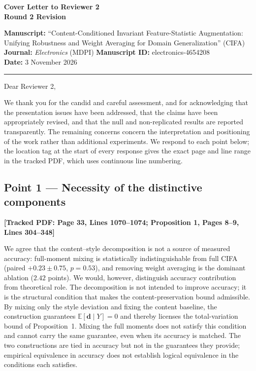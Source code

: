 \documentclass[11pt]{article}
\newcommand{\loc}[1]{\textbf{[\textcolor{revblue}{Tracked PDF: #1}]}}
\begin{document}
\begin{center}
{\Large\textbf{Cover Letter to Reviewer 2}}\\[0.5em]
\textbf{Round 2 Revision}
\end{center}

\textbf{Manuscript:} ``Content-Conditioned Invariant Feature-Statistic
Augmentation: Unifying Robustness and Weight Averaging for Domain
Generalization'' (CIFA)\\
\textbf{Journal:} \textit{Electronics} (MDPI)\qquad
\textbf{Manuscript ID:} electronics-4654208\\
\textbf{Date:} 3 November 2026

\hrule
\vspace{0.4em}

Dear Reviewer 2,

We thank you for the candid and careful assessment, and for acknowledging that
the presentation issues have been addressed, that the claims have been
appropriately revised, and that the null and non-replicated results are reported
transparently. The remaining concerns concern the interpretation and
positioning of the work rather than additional experiments. We respond to each
point below; the location tag at the start of every response gives the exact
page and line range in the tracked PDF, which uses continuous line numbering.

\subsection*{Point 1 --- Necessity of the distinctive components}
\loc{Page 33, Lines 1070--1074; Proposition 1, Pages 8--9, Lines 304--348}

We agree that the content--style decomposition is not a source of measured
accuracy: full-moment mixing is statistically indistinguishable from full CIFA
(paired $+0.23\pm0.75$, $p=0.53$), and removing weight averaging is the
dominant ablation ($2.42$ points). We would, however, distinguish accuracy
contribution from theoretical role. The decomposition is not intended to
improve accuracy; it is the structural condition that makes the
content-preservation bound admissible. By mixing only the style deviation and
fixing the content baseline, the construction guarantees
$\mathbb{E}[\mathbf{d}\mid Y]=0$ and thereby licenses the total-variation bound
of Proposition~1. Mixing the full moments does not satisfy this condition and
cannot carry the same guarantee, even when its accuracy is matched. The two
constructions are tied in accuracy but not in the guarantees they provide;
empirical equivalence in accuracy does not establish logical equivalence in the
conditions each satisfies.
\end{document}

